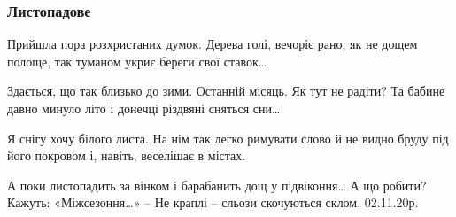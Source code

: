  
 
 

\subsubsection{Листопадове}

Прийшла пора розхристаних думок.
Дерева голі, вечоріє рано,
як не дощем полоще, так туманом
укриє береги свої ставок…

Здається, що так близько до зими.
Останній місяць. Як тут не радіти?
Та бабине давно минуло літо
і донечці різдвяні сняться сни…

Я снігу хочу білого листа.
На нім так легко римувати слово
й не видно бруду під його покровом
і, навіть, веселішає в містах.

А поки листопадить за вінком
і барабанить дощ у підвіконня…
А що робити? Кажуть: «Міжсезоння…» –
Не краплі – сльози скочуються склом.
02.11.20р.
